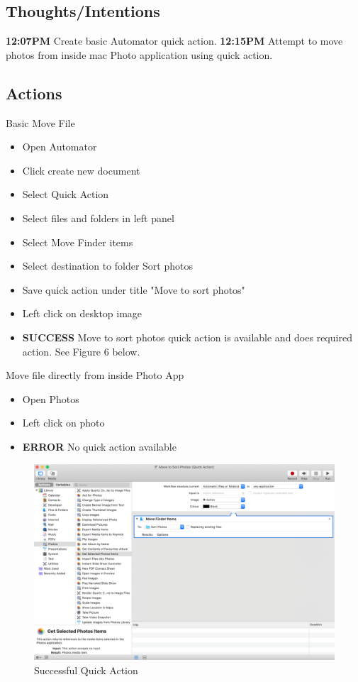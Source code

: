 \documentclass{article}
\begin{document}
\subsection{Thoughts/Intentions}
\textbf{12:07PM} Create basic Automator quick action.
\textbf{12:15PM} Attempt to move photos from inside mac Photo application using quick action.

\subsection{Actions}
Basic Move File
\begin{itemize}
\item Open Automator
\item Click create new document
\item Select Quick Action
\item Select files and folders in left panel
\item Select Move Finder items
\item Select destination to folder Sort photos
\item Save quick action under title "Move to sort photos"
\item Left click on desktop image
\item \textbf{SUCCESS} Move to sort photos quick action is available and does required action. See Figure 6 below.
\end{itemize}
Move file directly from inside Photo App
\begin{itemize}
\item Open Photos
\item Left click on photo
\item \textbf{ERROR} No quick action available
\end{itemize}

\begin{figure}[H]
    \centering
    \includegraphics[width=\textwidth]{Images/Automator_3.png}
    \caption{Successful Quick Action}
    \label{fig:my_label}
\end{figure}
\end{document}
